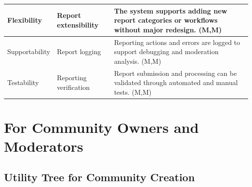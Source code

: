 \documentclass{article}
\begin{document}
\begin{table}[H]
\begin{tabular}{|p{3cm}|p{4cm}|p{7cm}|}
Flexibility
& Report extensibility
& The system supports adding new report categories or workflows without major redesign. (M,M) \\
\hline

Supportability
& Report logging
& Reporting actions and errors are logged to support debugging and moderation analysis. (M,M) \\
\hline

Testability
& Reporting verification
& Report submission and processing can be validated through automated and manual tests. (M,M) \\
\hline

\end{tabular}
\end{table}

\section{For Community Owners and Moderators}

\subsection{Utility Tree for Community Creation}
\end{document}
